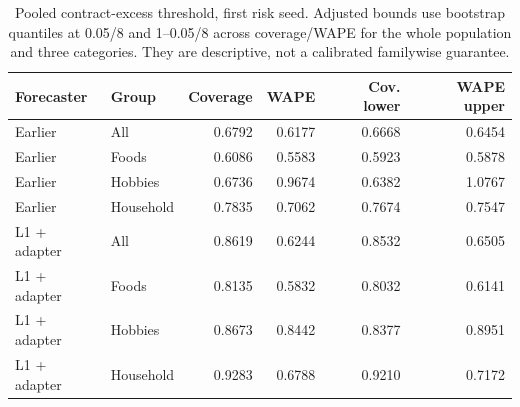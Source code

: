 \begin{table}[t]
\centering\small
\caption{Pooled contract-excess threshold, first risk seed. Adjusted bounds use bootstrap quantiles at 0.05/8 and 1--0.05/8 across coverage/WAPE for the whole population and three categories. They are descriptive, not a calibrated familywise guarantee.}
\label{tab:groups}
\begin{tabular}{llrrrr}
\toprule
Forecaster & Group & Coverage & WAPE & Cov. lower & WAPE upper\\
\midrule
Earlier & All & 0.6792 & 0.6177 & 0.6668 & 0.6454\\
Earlier & Foods & 0.6086 & 0.5583 & 0.5923 & 0.5878\\
Earlier & Hobbies & 0.6736 & 0.9674 & 0.6382 & 1.0767\\
Earlier & Household & 0.7835 & 0.7062 & 0.7674 & 0.7547\\
L1 + adapter & All & 0.8619 & 0.6244 & 0.8532 & 0.6505\\
L1 + adapter & Foods & 0.8135 & 0.5832 & 0.8032 & 0.6141\\
L1 + adapter & Hobbies & 0.8673 & 0.8442 & 0.8377 & 0.8951\\
L1 + adapter & Household & 0.9283 & 0.6788 & 0.9210 & 0.7172\\
\bottomrule
\end{tabular}
\end{table}
